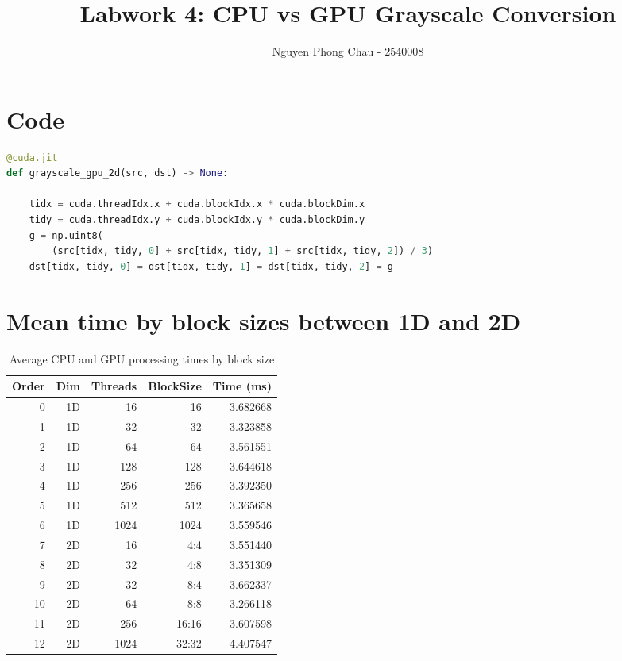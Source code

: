 \documentclass[a4paper,11pt]{report}
\begin{document}
\title{Labwork 4: CPU vs GPU Grayscale Conversion}
\author{Nguyen Phong Chau - 2540008}
\maketitle

\section*{Code}
\begin{lstlisting}[language=Python]
@cuda.jit
def grayscale_gpu_2d(src, dst) -> None:

    tidx = cuda.threadIdx.x + cuda.blockIdx.x * cuda.blockDim.x
    tidy = cuda.threadIdx.y + cuda.blockIdx.y * cuda.blockDim.y
    g = np.uint8(
        (src[tidx, tidy, 0] + src[tidx, tidy, 1] + src[tidx, tidy, 2]) / 3)
    dst[tidx, tidy, 0] = dst[tidx, tidy, 1] = dst[tidx, tidy, 2] = g
\end{lstlisting}

\section*{Mean time by block sizes between 1D and 2D}


\begin{table}[htbp]
\centering
\caption{Average CPU and GPU processing times by block size}
\begin{tabular}{rrrrr}
\toprule
Order & Dim & Threads & BlockSize & Time (ms) \\
\midrule
0 & 1D & 16 & 16 & 3.682668 \\
1 & 1D & 32 & 32 & 3.323858 \\
2 & 1D & 64 & 64 & 3.561551 \\
3 & 1D & 128 & 128 & 3.644618 \\
4 & 1D & 256 & 256 & 3.392350 \\
5 & 1D & 512 & 512 & 3.365658 \\
6 & 1D & 1024 & 1024 & 3.559546 \\
7 & 2D & 16 & 4:4 & 3.551440 \\
8 & 2D & 32 & 4:8 & 3.351309 \\
9 & 2D & 32 & 8:4 & 3.662337 \\
10 & 2D & 64 & 8:8 & 3.266118 \\
11 & 2D & 256 & 16:16 & 3.607598 \\
12 & 2D & 1024 & 32:32 & 4.407547 \\
\bottomrule
\end{tabular}
\end{table}
\end{document}
